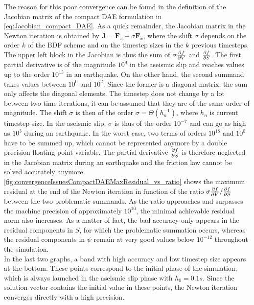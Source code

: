 The reason for this poor convergence can be found in the definition of the Jacobian matrix of the compact DAE formulation in \autoref{eq:Jacobian_compact_DAE}. As a quick remainder, the Jacobian matrix in the Newton iteration is obtained by $\mathbf{J} = \mathbf{F}_x + \sigma \mathbf{F}_{\dot{x}}$, where the shift $\sigma$ depends on the order $k$ of the BDF scheme and on the timestep sizes in the $k$ previous timesteps. The upper left block in the Jacobian is thus the sum of $\sigma\pdv{f}{V}$ and $\pdv{f}{S}$. The first partial derivative is of the magnitude $10^9$ in the aseismic slip and reaches values up to the order $10^{15}$ in an earthquake. On the other hand, the second summand takes values between $10^0$ and $10^2$. Since the former is a diagonal matrix, the sum only affects the diagonal elements. The timestep does not change by a lot between two time iterations, it can be assumed that they are of the same order of magnitude. The shift $\sigma$ is then of the order $\sigma = \Theta\left(h_n^{-1}\right)$, where $h_n$ is current timestep size. In the aseismic slip, $\sigma$ is thus of the order $10^{-7}$ and can go as high as $10^3$ during an earthquake. In the worst case, two terms of orders $10^{18}$ and $10^0$ have to be summed up, which cannot be represented anymore by a double precision floating point variable. The partial derivative $\pdv{f}{S}$ is therefore neglected in the Jacobian matrix during an earthquake and the friction law cannot be solved accurately anymore.
\autoref{fig:convergenceIssuesCompactDAEMaxResidual_vs_ratio} shows the maximum residual at the end of the Newton iteration in function of the ratio $\sigma\pdv{f}{V} / \pdv{f}{S}$ between the two problematic summands. As the ratio approaches and surpasses the machine precision of approximately $10^{16}$, the minimal achievable residual norm also increases. As a matter of fact, the bad accuracy only appears in the residual components in $S$, for which the problematic summation occurs, whereas the residual components in $\psi$ remain at very good values below $10^{-12}$ throughout the simulation.
\\
In the last two graphs, a band with high accuracy and low timestep size appears at the bottom. These points correspond to the initial phase of the simulation, which is always launched in the aseismic slip phase with $h_0=0.1s$. Since the solution vector contains the initial value in these points, the Newton iteration converges directly with a high precision. \\
